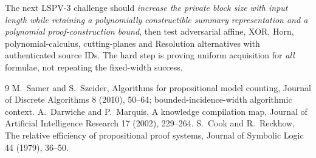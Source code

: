\documentclass[11pt]{article}
\begin{document}
The next LSPV-3 challenge should \emph{increase the private block size with input length while retaining a polynomially constructible summary representation and a polynomial proof-construction bound}, then test adversarial affine, XOR, Horn, polynomial-calculus, cutting-planes and Resolution alternatives with authenticated source IDs. The hard step is proving uniform acquisition for \emph{all} formulae, not repeating the fixed-width success.

\begin{thebibliography}{9}
 M.~Samer and S.~Szeider, Algorithms for propositional model counting, Journal of Discrete Algorithms 8 (2010), 50--64; bounded-incidence-width algorithmic context.
 A.~Darwiche and P.~Marquis, A knowledge compilation map, Journal of Artificial Intelligence Research 17 (2002), 229--264.
 S.~Cook and R.~Reckhow, The relative efficiency of propositional proof systems, Journal of Symbolic Logic 44 (1979), 36--50.
\end{thebibliography}
\end{document}
